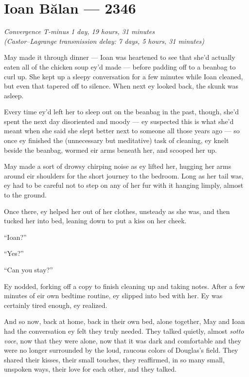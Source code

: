 \hypertarget{ioan-bux103lan-2346}{%
\chapter{Ioan Bălan — 2346}\label{ioan-bux103lan-2346}}

\begin{center}
\emph{Convergence T-minus 1 day, 19 hours, 31 minutes}\\
\emph{(Castor--Lagrange transmission delay: 7 days, 5 hours, 31 minutes)}
\end{center}

\noindent May made it through dinner — Ioan was heartened to see that she'd actually eaten all of the chicken soup ey'd made — before padding off to a beanbag to curl up. She kept up a sleepy conversation for a few minutes while Ioan cleaned, but even that tapered off to silence. When next ey looked back, the skunk was asleep.

Every time ey'd left her to sleep out on the beanbag in the past, though, she'd spent the next day disoriented and moody — ey suspected this is what she'd meant when she said she slept better next to someone all those years ago — so once ey finished the (unnecessary but meditative) task of cleaning, ey knelt beside the beanbag, wormed eir arms beneath her, and scooped her up.

May made a sort of drowsy chirping noise as ey lifted her, hugging her arms around eir shoulders for the short journey to the bedroom. Long as her tail was, ey had to be careful not to step on any of her fur with it hanging limply, almost to the ground.

Once there, ey helped her out of her clothes, unsteady as she was, and then tucked her into bed, leaning down to put a kiss on her cheek.

``Ioan?''

``Yes?''

``Can you stay?''

Ey nodded, forking off a copy to finish cleaning up and taking notes. After a few minutes of eir own bedtime routine, ey slipped into bed with her. Ey was certainly tired enough, ey realized.

And so now, back at home, back in their own bed, alone together, May and Ioan had the conversation ey felt they truly needed. They talked quietly, almost \emph{sotto voce}, now that they were alone, now that it was dark and comfortable and they were no longer surrounded by the loud, raucous colors of Douglas's field. They shared their kisses, their small touches, they reaffirmed, in so many small, unspoken ways, their love for each other, and they talked.


